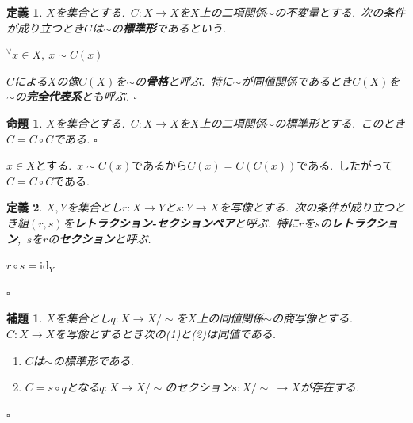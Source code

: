 \documentclass[uplatex,dvipdfmx]{jsarticle}
\makeatletter
\theoremstyle{noperiod}
\newtheorem{definition}{定義}
\newtheorem{proposition}{命題}
\newtheorem{lemma}{補題}
\renewenvironment{proof}[1][\proofname]{\par
  \pushQED{\qed}
  \normalfont \topsep6\p@\@plus6\p@\relax
  \trivlist
  \item[\hskip\labelsep
        \itshape
    #1 ]\ignorespaces
}{
  \popQED\endtrivlist\@endpefalse
}
\renewcommand{\proofname}{\bfseries 証明}
\makeatother
\begin{document}
\begin{definition}
$X$を集合とする.\ $C \colon X \to X$を$X$上の二項関係$\sim$の不変量とする.\ 次の条件が成り立つとき$C$は$\sim$の\textbf{標準形}であるという.
\begin{center}
  ${^{\forall}x} \in X,\ x \sim C(x)$
\end{center}
$C$による$X$の像$C(X)$を$\sim$の\textbf{骨格}と呼ぶ.\ 特に$\sim$が同値関係であるとき$C(X)$を$\sim$の\textbf{完全代表系}とも呼ぶ.
\hfill $\square$
\end{definition}

\begin{proposition}
$X$を集合とする.\ $C \colon X \to X$を$X$上の二項関係$\sim$の標準形とする.\ このとき$C = C \circ C$である.
\hfill $\square$
\end{proposition}

\begin{proof}
$x \in X$とする.\ $x \sim C(x)$であるから$C(x) = C(C(x))$である.\ したがって$C = C \circ C$である.
\end{proof}

\begin{definition}
$X,Y$を集合とし$r \colon X \to Y$と$s \colon Y \to X$を写像とする.\ 次の条件が成り立つとき組$(r,s)$を\textbf{レトラクション-セクションペア}と呼ぶ.\ 特に$r$を$s$の\textbf{レトラクション},\ $s$を$r$の\textbf{セクション}と呼ぶ.
\begin{center}
  $r \circ s = \mathrm{id}_Y$
\end{center}
\hfill $\square$
\end{definition}

\begin{lemma}
$X$を集合とし$q \colon X \to X/\sim$を$X$上の同値関係$\sim$の商写像とする.\ $C \colon X \to X$を写像とするとき次の(1)と(2)は同値である.
\def\labelenumi{(\theenumi)}
\begin{enumerate}
  \item $C$は$\sim$の標準形である.
  \item $C = s \circ q$となる$q \colon X \to X/\sim$のセクション$s \colon X/\sim\ \to X$が存在する.
\end{enumerate}
\hfill $\square$
\end{lemma}
\end{document}
